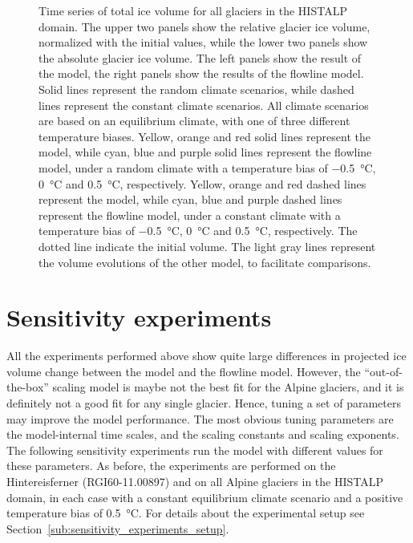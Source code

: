 \begin{figure}[htp]
      \caption{Time series of total ice volume for all glaciers in the HISTALP domain. The upper two panels show the relative glacier ice volume, normalized with the initial values, while the lower two panels show the absolute glacier ice volume. The left panels show the result of the \vas{} model, the right panels show the results of the flowline model. Solid lines represent the random climate scenarios, while dashed lines represent the constant climate scenarios. All climate scenarios are based on an equilibrium climate, with one of three different temperature biases.
      Yellow, orange and red solid lines represent the \vas{} model, while cyan, blue and purple solid lines represent the flowline model, under a random climate with a temperature bias of \SI{-.5}{\celsius}, \SI{0}{\celsius} and \SI{+.5}{\celsius}, respectively. Yellow, orange and red dashed lines represent the \vas{} model, while cyan, blue and purple dashed lines represent the flowline model, under a constant climate with a temperature bias of \SI{-.5}{\celsius}, \SI{0}{\celsius} and \SI{+.5}{\celsius}, respectively. %
      The dotted line indicate the initial volume. The light gray lines represent the volume evolutions of the other model, to facilitate comparisons.}
      \label{fig:histalp_commitment}
    \end{figure}


  \section{Sensitivity experiments} %
  \label{sec:sensitivity_experiments_results}

    All the experiments performed above show quite large differences in projected ice volume change between the \vas{} model and the flowline model. However, the ``out-of-the-box'' scaling model is maybe not the best fit for the Alpine glaciers, and it is definitely not a good fit for any single glacier. Hence, tuning a set of parameters may improve the model performance.
    The most obvious tuning parameters are the model-internal time scales, and the scaling constants and scaling exponents. The following sensitivity experiments run the \vas{} model with different values for these parameters. As before, the experiments are performed on the Hintereisferner (RGI60-11.00897) and on all Alpine glaciers in the HISTALP domain, in each case with a constant equilibrium climate scenario and a positive temperature bias of \SI{+0.5}{\celsius}. For details about the experimental setup see Section~\ref{sub:sensitivity_experiments_setup}.

